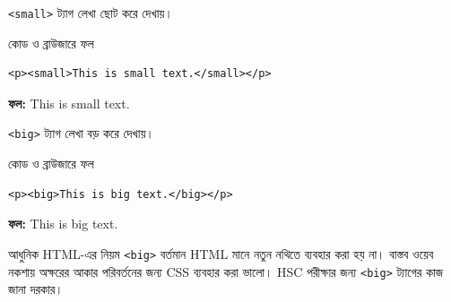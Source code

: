 \texttt{<small>} ট্যাগ লেখা ছোট করে দেখায়।

\begin{chFourWholeExample}{কোড ও ব্রাউজারে ফল}
\noindent
\begin{minipage}[t]{.50\linewidth}\vspace{0pt}

\begin{verbatim}
<p><small>This is small text.</small></p>
\end{verbatim}

\end{minipage}\hfill
\begin{minipage}[t]{.46\linewidth}\vspace{0pt}
\textbf{ফল:} {\small This is small text.}\\
\end{minipage}
\end{chFourWholeExample}

\texttt{<big>} ট্যাগ লেখা বড় করে দেখায়।

\begin{chFourWholeExample}{কোড ও ব্রাউজারে ফল}
\noindent
\begin{minipage}[t]{.50\linewidth}\vspace{0pt}

\begin{verbatim}
<p><big>This is big text.</big></p>
\end{verbatim}

\end{minipage}\hfill
\begin{minipage}[t]{.46\linewidth}\vspace{0pt}
\textbf{ফল:} {\large This is big text.}\\
\end{minipage}
\end{chFourWholeExample}

\begin{mistakebox}{আধুনিক HTML-এর নিয়ম}
\texttt{<big>} বর্তমান HTML মানে নতুন নথিতে ব্যবহার করা হয় না। বাস্তব ওয়েব নকশায় অক্ষরের আকার পরিবর্তনের জন্য CSS ব্যবহার করা ভালো। HSC পরীক্ষার জন্য \texttt{<big>} ট্যাগের কাজ জানা দরকার।
\end{mistakebox}

